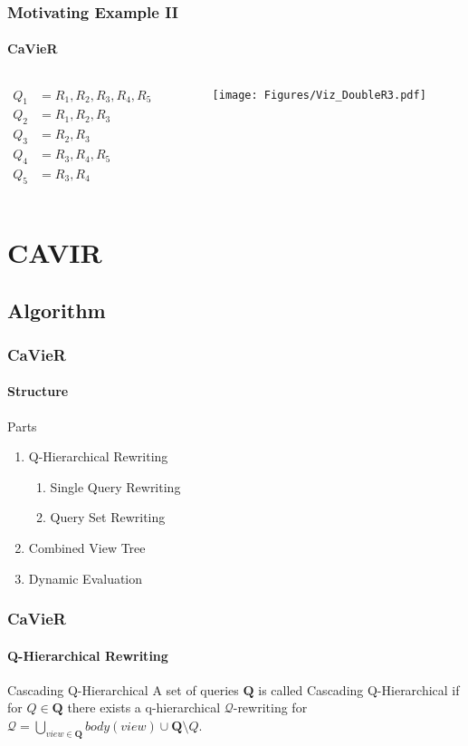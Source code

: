 \documentclass[
	11pt, %
]{beamer}
\begin{document}
\begin{frame}
	\frametitle{Motivating Example II}
	\framesubtitle{CaVieR}
	\begin{columns}
		\begin{column}{0.3\textwidth}
			\begin{align*}
				Q_1 &= R_1, R_2, R_3, R_4, R_5\\
				Q_2 &= R_1, R_2, R_3\\
				Q_3 &= R_2, R_3\\
				Q_4 &= R_3, R_4, R_5\\
				Q_5 &= R_3, R_4
			\end{align*}
		\end{column}
		
		\begin{column}{0.7\textwidth}
			\begin{figure}
           	 	\texttt{[image: Figures/Viz\_DoubleR3.pdf]}
			\end{figure}
		\end{column}
		
	\end{columns}
\end{frame}



\section{CAVIR}
\subsection{Algorithm}
\begin{frame}
	\frametitle{CaVieR }
	\framesubtitle{Structure}
	\begin{block}{Parts}
		\begin{enumerate}
			\item Q-Hierarchical Rewriting
			\begin{enumerate}
				\item Single Query Rewriting
				\item Query Set Rewriting
			\end{enumerate}
			\item Combined View Tree
			\item Dynamic Evaluation
		\end{enumerate}
	\end{block}
\end{frame}

\begin{frame}
	\frametitle{CaVieR}
	\framesubtitle{Q-Hierarchical Rewriting}
	\begin{block}{Cascading Q-Hierarchical}
	    A set of queries $\mathbf{Q}$ is called Cascading Q-Hierarchical if for $Q \in \mathbf{Q}$ there exists a q-hierarchical $\mathcal{Q}$-rewriting for $\mathcal{Q} = \bigcup_{view \in \mathbf{Q}}body(view) \cup \mathbf{Q}\setminus Q$.
	\end{block}
\end{frame}
\end{document}
